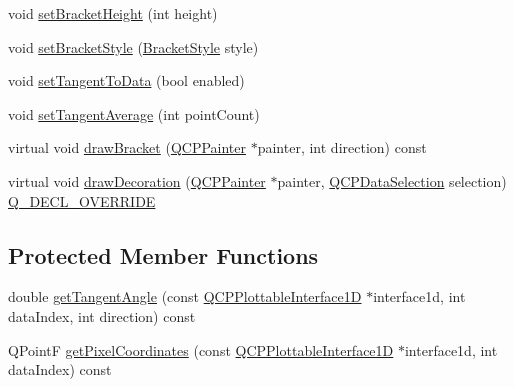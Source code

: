 \begin{DoxyCompactItemize}
\item 
void \mbox{\hyperlink{class_q_c_p_selection_decorator_bracket_aed773ad737201cca40efc6fe451acad8}{set\+Bracket\+Height}} (int height)
\item 
void \mbox{\hyperlink{class_q_c_p_selection_decorator_bracket_a04507697438f6ad8cc2aeea5422dcbe5}{set\+Bracket\+Style}} (\mbox{\hyperlink{class_q_c_p_selection_decorator_bracket_aa6d18517ec0553575bbef0de4252336e}{Bracket\+Style}} style)
\item 
void \mbox{\hyperlink{class_q_c_p_selection_decorator_bracket_a93bc6086e53a5e40a08641a7b2e2cdd5}{set\+Tangent\+To\+Data}} (bool enabled)
\item 
void \mbox{\hyperlink{class_q_c_p_selection_decorator_bracket_adb2d0876f25a77c88042b70818f1d6e4}{set\+Tangent\+Average}} (int point\+Count)
\item 
virtual void \mbox{\hyperlink{class_q_c_p_selection_decorator_bracket_a57b65b5508d5bd0f27c9318f3d4646be}{draw\+Bracket}} (\mbox{\hyperlink{class_q_c_p_painter}{Q\+C\+P\+Painter}} $\ast$painter, int direction) const
\item 
virtual void \mbox{\hyperlink{class_q_c_p_selection_decorator_bracket_a9ebe2e729b5012c0a995d788f87fac22}{draw\+Decoration}} (\mbox{\hyperlink{class_q_c_p_painter}{Q\+C\+P\+Painter}} $\ast$painter, \mbox{\hyperlink{class_q_c_p_data_selection}{Q\+C\+P\+Data\+Selection}} selection) \mbox{\hyperlink{qcustomplot_8h_a42cc5eaeb25b85f8b52d2a4b94c56f55}{Q\+\_\+\+D\+E\+C\+L\+\_\+\+O\+V\+E\+R\+R\+I\+DE}}
\end{DoxyCompactItemize}
\subsection*{Protected Member Functions}
\begin{DoxyCompactItemize}
\item 
double \mbox{\hyperlink{class_q_c_p_selection_decorator_bracket_ac002e20586950bf5c91a399863769c61}{get\+Tangent\+Angle}} (const \mbox{\hyperlink{class_q_c_p_plottable_interface1_d}{Q\+C\+P\+Plottable\+Interface1D}} $\ast$interface1d, int data\+Index, int direction) const
\item 
Q\+PointF \mbox{\hyperlink{class_q_c_p_selection_decorator_bracket_a9925ed667e8a645fcb9949bd02ee4a19}{get\+Pixel\+Coordinates}} (const \mbox{\hyperlink{class_q_c_p_plottable_interface1_d}{Q\+C\+P\+Plottable\+Interface1D}} $\ast$interface1d, int data\+Index) const
\end{DoxyCompactItemize}
